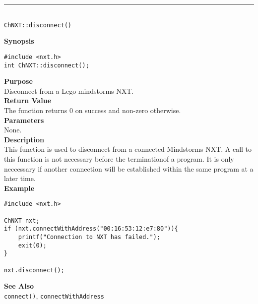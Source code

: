 \noindent
\vspace{5pt}
\rule{4.5in}{0.015in}\\
\noindent
{\LARGE \texttt{ChNXT::disconnect()} }\\


\noindent
{\bf Synopsis}
\vspace{-8pt}
\begin{verbatim}
#include <nxt.h>
int ChNXT::disconnect();
\end{verbatim}

\noindent
{\bf Purpose}\\
Disconnect from a Lego mindstorms NXT.\\

\noindent
{\bf Return Value}\\
The function returns 0 on success and non-zero otherwise.\\

\noindent
{\bf Parameters}\\
None.\\

\noindent
{\bf Description}\\
This function is used to disconnect from a connected Mindstorms NXT. A call to this function is not necessary before the terminationof a program. It is only neccessary if another connection will be established within the same program at a later time.\\

\noindent
{\bf Example}
\begin{verbatim}
#include <nxt.h> 

ChNXT nxt;
if (nxt.connectWithAddress("00:16:53:12:e7:80")){
    printf("Connection to NXT has failed.");
    exit(0);
}
    
nxt.disconnect();
\end{verbatim}

\noindent
{\bf See Also}\\
\texttt{connect()}, \texttt{connectWithAddress}\\
